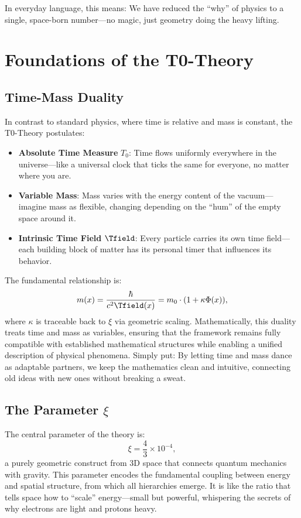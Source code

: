 	In everyday language, this means: We have reduced the ``why'' of physics to a single, space-born number—no magic, just geometry doing the heavy lifting.
	
	\section{Foundations of the T0-Theory}
	\subsection{Time-Mass Duality}
	In contrast to standard physics, where time is relative and mass is constant, the T0-Theory postulates:
	\begin{itemize}
		\item \textbf{Absolute Time Measure} $T_0$: Time flows uniformly everywhere in the universe—like a universal clock that ticks the same for everyone, no matter where you are.
		\item \textbf{Variable Mass}: Mass varies with the energy content of the vacuum—imagine mass as flexible, changing depending on the ``hum'' of the empty space around it.
		\item \textbf{Intrinsic Time Field} $\Tfield$: Every particle carries its own time field—each building block of matter has its personal timer that influences its behavior.
	\end{itemize}
	
	The fundamental relationship is:
	\[
	m(x) = \frac{\hbar}{c^2 \Tfield(x)} = m_0 \cdot (1 + \kappa \Phi(x)),
	\]
	where $\kappa$ is traceable back to $\xi$ via geometric scaling. Mathematically, this duality treats time and mass as variables, ensuring that the framework remains fully compatible with established mathematical structures while enabling a unified description of physical phenomena. Simply put: By letting time and mass dance as adaptable partners, we keep the mathematics clean and intuitive, connecting old ideas with new ones without breaking a sweat.
	
	\subsection{The Parameter $\xi$}
	The central parameter of the theory is:
	\[
	\xi = \frac{4}{3} \times 10^{-4},
	\]
	a purely geometric construct from 3D space that connects quantum mechanics with gravity. This parameter encodes the fundamental coupling between energy and spatial structure, from which all hierarchies emerge. It is like the ratio that tells space how to ``scale'' energy—small but powerful, whispering the secrets of why electrons are light and protons heavy.
	
